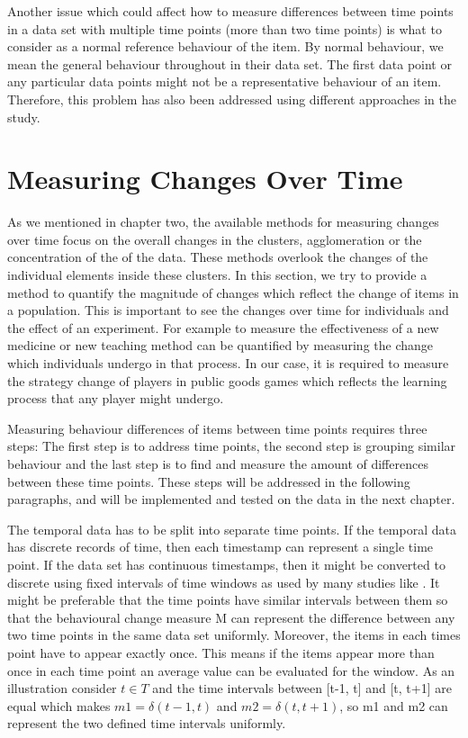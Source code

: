 Another issue which could affect how to measure differences between time points in a data set with multiple time points (more than two time points) is what to consider as a normal reference behaviour of the item. By normal behaviour, we mean the general behaviour throughout in their data set. The first data point or any particular data points might not be a representative behaviour of an item. Therefore, this problem has also been addressed using different approaches in the study.


\section{Measuring Changes Over Time}
\label{MeasuringChangesOverTime}

As we mentioned in chapter two, the available methods for measuring changes over time focus on the overall changes in the clusters, agglomeration or the concentration of the of the data. These methods overlook the changes of the individual elements inside these clusters. In this section, we try to provide a method to quantify the magnitude of changes which reflect the change of items in a population. This is important to see the changes over time for individuals and the effect of an experiment. For example to measure the effectiveness of a new medicine or new teaching method can be quantified by measuring the change which individuals undergo in that process. In our case, it is required to measure the strategy change of players in public goods games which reflects the learning process that any player might undergo.

Measuring behaviour differences of items between time points requires three steps: The first step is to address time points, the second step is grouping similar behaviour and the last step is to find and measure the amount of differences between these time points. These steps will be addressed in the following paragraphs, and will be implemented and tested on the data in the next chapter.

The temporal data has to be split into separate time points. If the temporal data has discrete records of time, then each timestamp can represent a single time point. If the data set has continuous timestamps, then it might be converted to discrete using fixed intervals of time windows as used by many studies like \cite{Spiliopoulou2006}. It might be preferable that the time points have similar intervals between them so that the behavioural change measure M can represent the difference between any two time points in the same data set uniformly. Moreover, the items in each times point have to appear exactly once. This means if the items appear more than once in each time point an average value can be evaluated for the window. As an illustration consider $t \in T$ and the time intervals between [t-1, t] and [t, t+1] are equal which makes $m1 = \delta(t-1, t)$ and $m2 = \delta(t, t+1)$, so m1 and m2 can represent the two defined time intervals uniformly.

